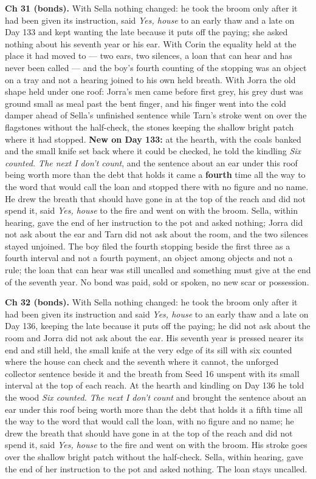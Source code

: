 \documentclass{design/chronicle}
\begin{document}
{\textbf{Ch 31 (bonds).} With Sella nothing changed: he took the broom only after it had been given its instruction, said \emph{Yes, house} to an early thaw and a late on Day 133 and kept wanting the late because it puts off the paying; she asked nothing about his seventh year or his ear. With Corin the equality held at the place it had moved to --- two ears, two silences, a loan that can hear and has never been called --- and the boy’s fourth counting of the stopping was an object on a tray and not a hearing joined to his own held breath. With Jorra the old shape held under one roof: Jorra’s men came before first grey, his grey dust was ground small as meal past the bent finger, and his finger went into the cold damper ahead of Sella’s unfinished sentence while Tarn’s stroke went on over the flagstones without the half-check, the stones keeping the shallow bright patch where it had stopped. \textbf{New on Day 133:} at the hearth, with the coals banked and the small knife set back where it could be checked, he told the kindling \emph{Six counted. The next I don’t count}, and the sentence about an ear under this roof being worth more than the debt that holds it came a \textbf{fourth} time all the way to the word that would call the loan and stopped there with no figure and no name. He drew the breath that should have gone in at the top of the reach and did not spend it, said \emph{Yes, house} to the fire and went on with the broom. Sella, within hearing, gave the end of her instruction to the pot and asked nothing; Jorra did not ask about the ear and Tarn did not ask about the room, and the two silences stayed unjoined. The boy filed the fourth stopping beside the first three as a fourth interval and not a fourth payment, an object among objects and not a rule; the loan that can hear was still uncalled and something must give at the end of the seventh year. No bond was paid, sold or spoken, no new scar or possession.

\textbf{Ch 32 (bonds).} With Sella nothing changed: he took the broom only after it had been given its instruction and said \emph{Yes, house} to an early thaw and a late on Day 136, keeping the late because it puts off the paying; he did not ask about the room and Jorra did not ask about the ear. His seventh year is pressed nearer its end and still held, the small knife at the very edge of its sill with six counted where the house can check and the seventh where it cannot, the unforged collector sentence beside it and the breath from Seed 16 unspent with its small interval at the top of each reach. At the hearth and kindling on Day 136 he told the wood \emph{Six counted. The next I don’t count} and brought the sentence about an ear under this roof being worth more than the debt that holds it a fifth time all the way to the word that would call the loan, with no figure and no name; he drew the breath that should have gone in at the top of the reach and did not spend it, said \emph{Yes, house} to the fire and went on with the broom. His stroke goes over the shallow bright patch without the half-check. Sella, within hearing, gave the end of her instruction to the pot and asked nothing. The loan stays uncalled.

}
\end{document}
